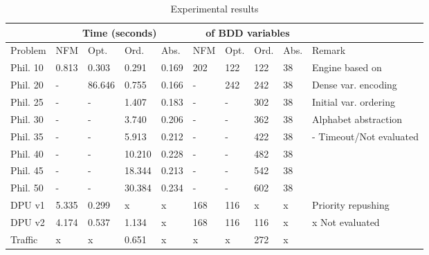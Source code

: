 \documentclass[10pt, a4paper, onecolumn, conference, compsocconf]{IEEEtran}
\begin{document}
\begin{table}[htp]
\center
\begin{threeparttable}
\caption{Experimental results \label{tab:philo}}
\begin{small}
\begin{tabular}{|l|llll|llll|l|}\hline
 & \multicolumn{4}{c|}{Time (seconds)} &\multicolumn{4}{c|}{ of BDD variables} & \\ \hline
Problem & NFM\tnote{1} & Opt.\tnote{2} &  Ord.\tnote{3} & Abs.\tnote{4} & NFM & Opt. &  Ord. & Abs. & Remark \\ \hline
Phil. 10 &0.813 & 0.303  & 0.291 & 0.169    & 202 & 122 & 122 & 38 &  Engine based on~\cite{cheng:vissbip:2011} \\
Phil. 20 &-     & 86.646 & 0.755 & 0.166      & -   & 242 & 242 & 38 &  Dense var. encoding\\
Phil. 25 &-     & -      & 1.407 & 0.183    & -   & -   & 302 & 38 &  Initial var. ordering\\
Phil. 30 &-     & -      & 3.740  & 0.206    & -   & -   & 362 & 38 &  Alphabet abstraction\\
Phil. 35 &-     & -      & 5.913 & 0.212    & -   & -   & 422 & 38 & - Timeout/Not evaluated \\
Phil. 40 &-     & -      & 10.210 & 0.228    & -   & -   & 482 & 38 &\\
Phil. 45 &-     & -      & 18.344 & 0.213   & -   & -  & 542 & 38 &\\
Phil. 50 &-     & -      & 30.384 & 0.234   & -   & -  & 602 & 38& \\ \hline\hline
DPU v1  & 5.335   & 0.299  &  x  & x   & 168  & 116  & x & x &  Priority repushing\\
DPU v2  & 4.174   & 0.537   &  1.134\tnote{R}  & x   & 168  & 116  & 116\tnote{R} & x & x Not evaluated\\ \hline\hline
Traffic  & x  & x   &  0.651  & x   & x  & x & 272 & x &\\ \hline
\end{tabular}
\end{small}
\end{threeparttable}
\end{table}
\end{document}
